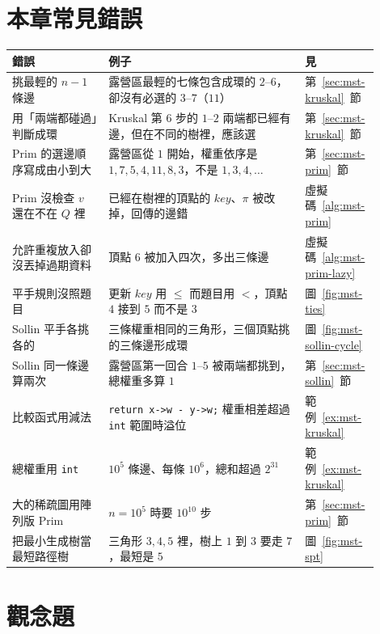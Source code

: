 \section{本章常見錯誤}
\label{sec:mst-pitfalls}

\begin{center}
\small
\begin{tabular}{>{\raggedright\arraybackslash}p{0.25\linewidth}>{\raggedright\arraybackslash}p{0.51\linewidth}>{\raggedright\arraybackslash}p{0.14\linewidth}}
\toprule
錯誤 & 例子 & 見 \\
\midrule
挑最輕的 $n - 1$ 條邊 & 露營區最輕的七條包含成環的 $2$--$6$，卻沒有必選的 $3$--$7$（$11$） &
第~\ref{sec:mst-kruskal}~節 \\
用「兩端都碰過」判斷成環 & Kruskal 第 6 步的 $1$--$2$ 兩端都已經有邊，但在不同的樹裡，應該選 &
第~\ref{sec:mst-kruskal}~節 \\
Prim 的選邊順序寫成由小到大 & 露營區從 $1$ 開始，權重依序是 $1, 7, 5, 4, 11, 8, 3$，不是 $1, 3, 4,
\ldots$ & 第~\ref{sec:mst-prim}~節 \\
Prim 沒檢查 $v$ 還在不在 $Q$ 裡 & 已經在樹裡的頂點的 $\mathit{key}$、$\pi$ 被改掉，回傳的邊錯 &
虛擬碼~\ref{alg:mst-prim} \\
允許重複放入卻沒丟掉過期資料 & 頂點 $6$ 被加入四次，多出三條邊 & 虛擬碼~\ref{alg:mst-prim-lazy} \\
平手規則沒照題目 & 更新 $\mathit{key}$ 用 $\le$ 而題目用 $<$，頂點 $4$ 接到 $5$ 而不是 $3$ &
圖~\ref{fig:mst-ties} \\
Sollin 平手各挑各的 & 三條權重相同的三角形，三個頂點挑的三條邊形成環 &
圖~\ref{fig:mst-sollin-cycle} \\
Sollin 同一條邊算兩次 & 露營區第一回合 $1$--$5$ 被兩端都挑到，總權重多算 $1$ & 第~\ref{sec:mst-sollin}~節 \\
比較函式用減法 & \texttt{return x->w - y->w;} 權重相差超過 \texttt{int} 範圍時溢位 &
範例~\ref{ex:mst-kruskal} \\
總權重用 \texttt{int} & $10^5$ 條邊、每條 $10^6$，總和超過 $2^{31}$ & 範例~\ref{ex:mst-kruskal} \\
大的稀疏圖用陣列版 Prim & $n = 10^5$ 時要 $10^{10}$ 步 & 第~\ref{sec:mst-prim}~節 \\
把最小生成樹當最短路徑樹 & 三角形 $3, 4, 5$ 裡，樹上 $1$ 到 $3$ 要走 $7$，最短是 $5$ & 圖~\ref{fig:mst-spt} \\
\bottomrule
\end{tabular}
\end{center}

\section{觀念題}
\label{sec:mst-exercises}


